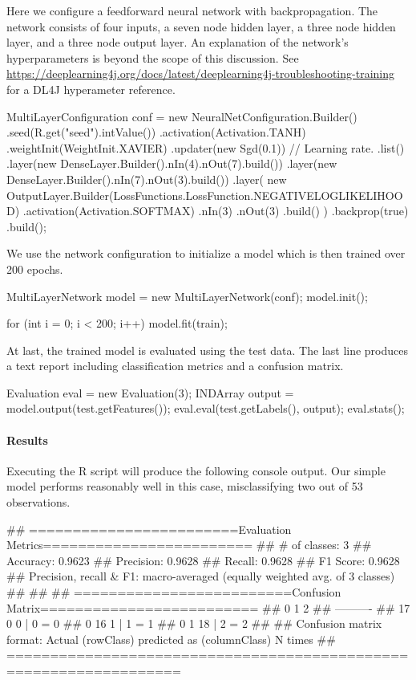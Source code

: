 Here we configure a feedforward neural network with backpropagation. The network consists of four inputs, a seven node hidden layer, a three node hidden layer, and a three node output layer. An explanation of the network's hyperparameters is beyond the scope of this discussion. See \url{https://deeplearning4j.org/docs/latest/deeplearning4j-troubleshooting-training} for a DL4J hyperameter reference.

\begin{example}
MultiLayerConfiguration conf = new NeuralNetConfiguration.Builder()
    .seed(R.get("seed").intValue())
    .activation(Activation.TANH)
    .weightInit(WeightInit.XAVIER)
    .updater(new Sgd(0.1)) // Learning rate.
    .list()
    .layer(new DenseLayer.Builder().nIn(4).nOut(7).build())
    .layer(new DenseLayer.Builder().nIn(7).nOut(3).build())
    .layer(
        new OutputLayer.Builder(LossFunctions.LossFunction.NEGATIVELOGLIKELIHOOD)
            .activation(Activation.SOFTMAX)
            .nIn(3)
            .nOut(3)
            .build()
      )
    .backprop(true)
    .build();
\end{example}

We use the network configuration to initialize a model which is then trained over 200 epochs.

\begin{example}
MultiLayerNetwork model = new MultiLayerNetwork(conf);
model.init();

for (int i = 0; i < 200; i++) {
    model.fit(train);
}
\end{example}

At last, the trained model is evaluated using the test data. The last line produces a text report including classification metrics and a confusion matrix.

\begin{example}
Evaluation eval = new Evaluation(3);
INDArray output = model.output(test.getFeatures());
eval.eval(test.getLabels(), output);
eval.stats();
\end{example}

\paragraph{Results} Executing the R script will produce the following console output. Our simple model performs reasonably well in this case, misclassifying two out of 53 observations.

\begin{example}
## ========================Evaluation Metrics========================
##  # of classes:    3
##  Accuracy:        0.9623
##  Precision:       0.9628
##  Recall:          0.9628
##  F1 Score:        0.9628
## Precision, recall & F1: macro-averaged (equally weighted avg. of 3 classes)
## 
## 
## =========================Confusion Matrix=========================
##   0  1  2
## ----------
##  17  0  0 | 0 = 0
##   0 16  1 | 1 = 1
##   0  1 18 | 2 = 2
## 
## Confusion matrix format: Actual (rowClass) predicted as (columnClass) N times
## ==================================================================
\end{example}

